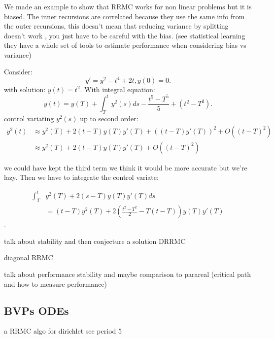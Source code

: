 \documentclass[a4paper,12pt]{article}
\begin{document}
\begin{example}

    We made an example to show that RRMC works for non linear problems but it is biased.
    The inner recursions are correlated because they use the same info from the outer
    recursions, this doesn't mean that reducing variance by splitting doesn't work
    , you just have to be careful with the bias. (see statistical learning they have
    a whole set of tools to estimate performance when considering bias vs variance)

    Consider:
    $$
        y' = y^{2} - t^{4} +2t,y(0)=0.
    $$
    with solution: $y(t)=t^{2}$. With integral equation:
    $$
        y(t)= y(T) + \int_{T}^{t} y^{2}(s) ds - \frac{t^{5}-T^{5}}{5} +(t^{2}-T^{2}) .
    $$
    control variating $y^{2}(s)$ up to second order:
    \begin{align*}
        y^{2}(t) & \approx y^{2}(T) + 2(t-T)y(T)y'(T) + ((t-T)y'(T))^{2} + O((t-T)^{2}) \\
                 & \approx y^{2}(T) + 2(t-T)y(T)y'(T)+ O((t-T)^{2})
    \end{align*}

    we could have kept the third term we think it would be more accurate but we're lazy. Then we have to integrate the control variate:

    \begin{align*}
        \int_{T}^{t} & y^{2}(T) + 2(s-T)y(T)y'(T) ds                                          \\
                     & = (t-T)y^{2}(T)+ 2\left(\frac{t^{2}-T^{2}}{2} -T(t-T) \right)y(T)y'(T)
    \end{align*}
    .
\end{example}

talk about stability and then conjecture a solution DRRMC

\begin{example}[DRRMC]
    diagonal RRMC
\end{example}

talk about performance stability and maybe comparison to parareal
(critical path and how to measure performance)


\subsection{BVPs ODEs}

\begin{example}
    a RRMC algo for dirichlet see period 5
\end{example}
\end{document}
